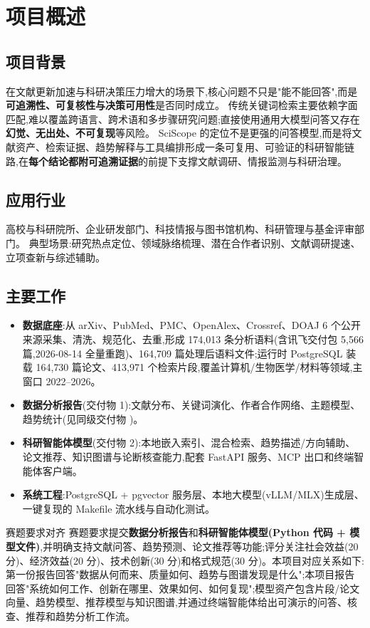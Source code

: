 \section{项目概述}

\subsection{项目背景}
在文献更新加速与科研决策压力增大的场景下,核心问题不只是"能不能回答",而是\textbf{可追溯性、可复核性与决策可用性}是否同时成立。
传统关键词检索主要依赖字面匹配,难以覆盖跨语言、跨术语和多步骤研究问题;直接使用通用大模型问答又存在\textbf{幻觉、无出处、不可复现}等风险。
SciScope 的定位不是更强的问答模型,而是将文献资产、检索证据、趋势解释与工具编排形成一条可复用、可验证的科研智能链路,在\textbf{每个结论都附可追溯证据}的前提下支撑文献调研、情报监测与科研治理。

\subsection{应用行业}
高校与科研院所、企业研发部门、科技情报与图书馆机构、科研管理与基金评审部门。
典型场景:研究热点定位、领域脉络梳理、潜在合作者识别、文献调研提速、立项查新与综述辅助。

\subsection{主要工作}
\begin{itemize}
\item \textbf{数据底座}:从 arXiv、PubMed、PMC、OpenAlex、Crossref、DOAJ 6 个公开来源采集、清洗、规范化、去重,形成 174{,}013 条分析语料(含讯飞交付包 5{,}566 篇,2026-08-14 全量重跑)、164{,}709 篇处理后语料文件;\newline 运行时 PostgreSQL 装载 164{,}730 篇论文、413{,}971 个检索片段,覆盖计算机/生物医学/材料等领域,主窗口 2022--2026。
\item \textbf{数据分析报告}(交付物 1):文献分布、关键词演化、作者合作网络、主题模型、趋势统计(见同级交付物 )。
\item \textbf{科研智能体模型}(交付物 2):本地嵌入索引、混合检索、趋势描述/方向辅助、论文推荐、知识图谱与论断核查能力,配套 FastAPI 服务、MCP 出口和终端智能体客户端。
\item \textbf{系统工程}:PostgreSQL + pgvector 服务层、本地大模型(vLLM/MLX)生成层、一键复现的 Makefile 流水线与自动化测试。
\end{itemize}

\begin{reportbox}{赛题要求对齐}
赛题要求提交\textbf{数据分析报告}和\textbf{科研智能体模型(Python 代码 + 模型文件)},并明确支持文献问答、趋势预测、论文推荐等功能;评分关注社会效益(20 分)、经济效益(20 分)、技术创新(30 分)和格式规范(30 分)。本项目对应关系如下:第一份报告回答"数据从何而来、质量如何、趋势与图谱发现是什么";本项目报告回答"系统如何工作、创新在哪里、效果如何、如何复现";模型资产包含片段/论文向量、趋势模型、推荐模型与知识图谱,并通过终端智能体给出可演示的问答、核查、推荐和趋势分析工作流。
\end{reportbox}

